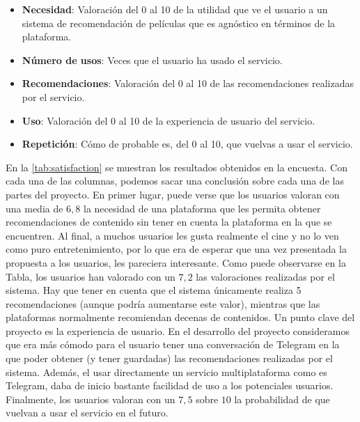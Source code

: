 \begin{itemize}
    \item \textbf{Necesidad}: Valoración del 0 al 10 de la utilidad que ve el usuario a un sistema de recomendación de películas que es agnóstico en términos de la plataforma.
    \item \textbf{Número de usos}: Veces que el usuario ha usado el servicio.
    \item \textbf{Recomendaciones}: Valoración del 0 al 10 de las recomendaciones realizadas por el servicio.
    \item \textbf{Uso}: Valoración del 0 al 10 de la experiencia de usuario del servicio.
    \item \textbf{Repetición}: Cómo de probable es, del 0 al 10, que vuelvas a usar el servicio.
\end{itemize}

En la \autoref{tab:satisfaction} se muestran los resultados obtenidos en la encuesta. Con cada una de las columnas, podemos sacar una conclusión sobre cada una de las partes del proyecto. En primer lugar, puede verse que los usuarios valoran con una media de $6,8$ la necesidad de una plataforma que les permita obtener recomendaciones de contenido sin tener en cuenta la plataforma en la que se encuentren. Al final, a muchos usuarios les gusta realmente el cine y no lo ven como puro entretenimiento, por lo que era de esperar que una vez presentada la propuesta a los usuarios, les pareciera interesante. Como puede observarse en la Tabla, los usuarios han valorado con un $7,2$ las valoraciones realizadas por el sistema. Hay que tener en cuenta que el sistema únicamente realiza 5 recomendaciones (aunque podría aumentarse este valor), mientras que las plataformas normalmente recomiendan decenas de contenidos. Un punto clave del proyecto es la experiencia de usuario. En el desarrollo del proyecto consideramos que era más cómodo para el usuario tener una conversación de Telegram en la que poder obtener (y tener guardadas) las recomendaciones realizadas por el sistema. Además, el usar directamente un servicio multiplataforma como es Telegram, daba de inicio bastante facilidad de uso a los potenciales usuarios. Finalmente, los usuarios valoran con un $7,5$ sobre $10$ la probabilidad de que vuelvan a usar el servicio en el futuro.

